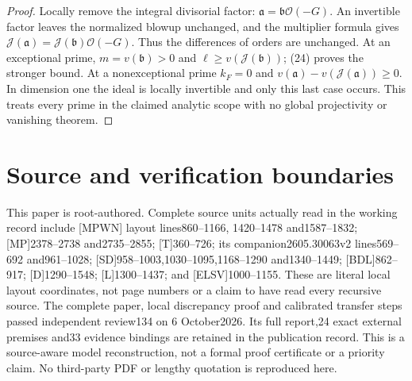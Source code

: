 \documentclass[11pt]{article}
\newcommand{\J}{\mathcal J}
\begin{document}
\begin{proof}
Locally remove the integral divisorial factor:
$\mathfrak a=\mathfrak b\mathcal O(-G)$.
An invertible factor leaves the normalized blowup unchanged, and
the multiplier formula gives
$\J(\mathfrak a)=\J(\mathfrak b)\mathcal O(-G)$.
Thus the differences of orders are unchanged. At an exceptional
prime, $m=v(\mathfrak b)>0$ and
$\ell\geq v(\J(\mathfrak b))$; (24) proves the stronger bound.
At a nonexceptional prime $k_F=0$ and
$v(\mathfrak a)-v(\J(\mathfrak a))\geq0$.
In dimension one the ideal is locally invertible and only this
last case occurs. This treats every prime in the claimed analytic
scope with no global projectivity or vanishing theorem.
\end{proof}

\section{Source and verification boundaries}
This paper is root-authored. Complete source units actually read
in the working record include [MPWN] layout lines860--1166,
1420--1478 and1587--1832; [MP]2378--2738 and2735--2855;
[T]360--726; its companion2605.30063v2 lines569--692 and961--1028;
[SD]958--1003,1030--1095,1168--1290 and1340--1449;
[BDL]862--917; [D]1290--1548; [L]1300--1437;
and [ELSV]1000--1155. These are literal local layout coordinates,
not page numbers or a claim to have read every recursive source.
The complete paper, local discrepancy proof and calibrated transfer
steps passed independent review134 on 6 October2026. Its full
report,24 exact external premises and33 evidence bindings are
retained in the publication record. This is a source-aware model
reconstruction, not a formal proof certificate or a priority claim.
No third-party PDF or lengthy quotation is reproduced here.
\end{document}
